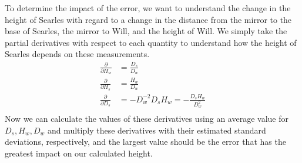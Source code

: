 \documentclass[11pt]{article}
\begin{document}
To determine the impact of the error, we want to understand the change in the height of Searles with regard to a change in the distance from the mirror to the base of Searles, the mirror to Will, and the height of Will. We simply take the partial derivatives with respect to each quantity to understand how the height of Searles depends on these measurements. \\
\begin{align*}
    \frac{\partial}{\partial H_w} &= \frac{D_s}{D_w} \\
	\frac{\partial}{\partial H_s} &= \frac{H_w}{D_w} \\
	\frac{\partial}{\partial D_s} &= -D_w^{-2}D_sH_w = -\frac{D_sH_w}{D_w^2} \\
\end{align*}
Now we can calculate the values of these derivatives using an average value for $D_s, H_w, D_w$ and multiply these derivatives with their estimated standard deviations, respectively, and the largest value should be the error that has the greatest impact on our calculated height.
\end{document}
